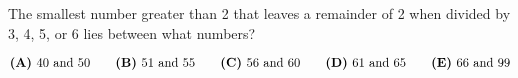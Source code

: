 

The smallest number greater than 2 that leaves a remainder of 2 when divided by 3, 4, 5, or 6 lies between what numbers?

$\textbf{(A)}\hspace{.05in}40\text{ and }50 \qquad \textbf{(B)}\hspace{.05in}51\text{ and }55 \qquad \textbf{(C)}\hspace{.05in}56\text{ and }60 \qquad \textbf{(D)}\hspace{.05in} \text{61 and 65}\qquad \textbf{(E)}\hspace{.05in} \text{66 and 99}$
